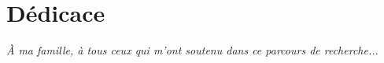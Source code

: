 \chapter*{Dédicace}

\begin{center}
    \textit{À ma famille, à tous ceux qui m'ont soutenu dans ce parcours de recherche...}
\end{center}